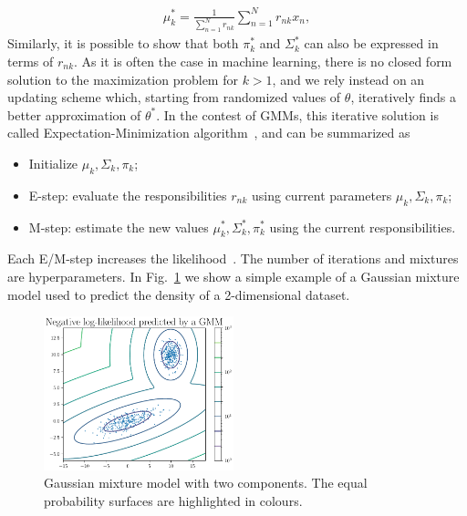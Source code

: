%
\begin{align}
\mu_k^{*} = \frac{1}{ \sum_{n=1}^{N} r_{nk}} \sum_{n=1}^{N} r_{nk} x_n,
\end{align}
%
Similarly, it is possible to show that both $\pi_k^{*}$ and $\Sigma_k^{*}$ can also be expressed in terms of $r_{nk}$. 
As it is often the case in machine learning, there is no closed form solution to the maximization problem for $k > 1$, and we rely instead on an updating scheme which, starting from randomized values of $\theta$, iteratively finds a better approximation of $\theta^{*}$.
In the contest of GMMs, this iterative solution is called Expectation-Minimization algorithm~\cite{ExpMin1}, and can be summarized as
%
\begin{itemize}
\item
Initialize $\mu_k, \Sigma_k, \pi_k$;
\item
E-step: evaluate the responsibilities $r_{nk}$ using current parameters $\mu_k, \Sigma_k, \pi_k$;
\item
M-step: estimate the new values $\mu_k^{*}, \Sigma_k^{*}, \pi_k^{*}$ using the current responsibilities.
\end{itemize}
Each E/M-step increases the likelihood~\cite{ExpMin2}. The number of iterations and mixtures are hyperparameters.
In Fig.~\ref{fig:gmm} we show a simple example of a Gaussian mixture model used to predict the density of a 2-dimensional dataset.
\begin{figure}[t]
\centering
\includegraphics[page = 1, width=0.49\textwidth]{./figures/gmm}
\caption{Gaussian mixture model with two components. The equal probability surfaces are highlighted in colours.}
\label{fig:gmm}
\end{figure}

